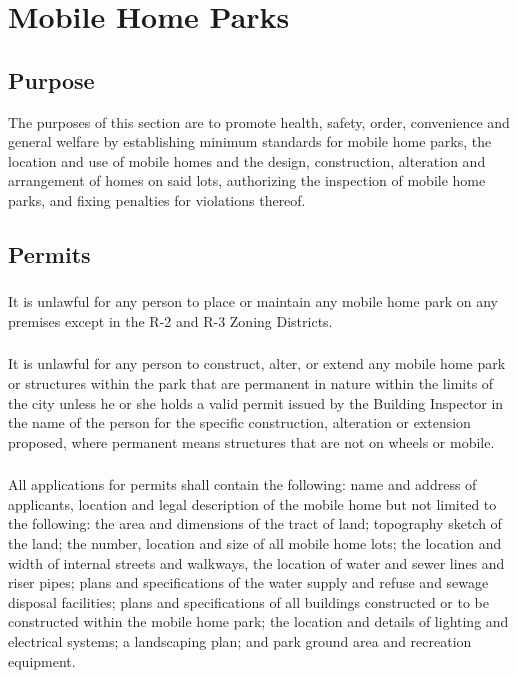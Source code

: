 \section{Mobile Home Parks}
\subsection{Purpose}
The purposes of this section are to promote health, safety, order, convenience and general welfare by establishing minimum standards for mobile home parks, the location and use of mobile homes and the design, construction, alteration and arrangement of homes on said lots, authorizing the inspection of mobile home parks, and fixing penalties for violations thereof.
\subsection{Permits}
\subsubsection{}
It is unlawful for any person to place or maintain any mobile home park on any premises except in the R-2 and R-3 Zoning Districts.
\subsubsection{}
It is unlawful for any person to construct, alter, or extend any mobile home park or structures within the park that are permanent in nature within the limits of the city unless he or she holds a valid permit issued by the Building Inspector in the name of the person for the specific construction, alteration or extension proposed, where permanent means structures that are not on wheels or mobile.
\subsubsection{}
All applications for permits shall contain the following: name and address of applicants, location and legal description of the mobile home but not limited to the following: the area and dimensions of the tract of land; topography sketch of the land; the number, location and size of all mobile home lots; the location and width of internal streets and walkways, the location of water and sewer lines and riser pipes; plans and specifications of the water supply and refuse and sewage disposal facilities; plans and specifications of all buildings constructed or to be constructed within the mobile home park; the location and details of lighting and electrical systems; a landscaping plan; and park ground area and recreation equipment.
